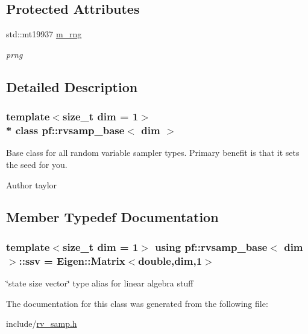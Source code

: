 \subsection*{Protected Attributes}
\begin{DoxyCompactItemize}
\item 
std\+::mt19937 \hyperlink{classpf_1_1rvsamp__base_ab24a599151b7ad0836ddee218b1941a1}{m\+\_\+rng}\hypertarget{classpf_1_1rvsamp__base_ab24a599151b7ad0836ddee218b1941a1}{}\label{classpf_1_1rvsamp__base_ab24a599151b7ad0836ddee218b1941a1}

\begin{DoxyCompactList}\small\item\em prng \end{DoxyCompactList}\end{DoxyCompactItemize}


\subsection{Detailed Description}
\subsubsection*{template$<$size\+\_\+t dim = 1$>$\\*
class pf\+::rvsamp\+\_\+base$<$ dim $>$}

Base class for all random variable sampler types. Primary benefit is that it sets the seed for you. 

\begin{DoxyAuthor}{Author}
taylor 
\end{DoxyAuthor}


\subsection{Member Typedef Documentation}
\subsubsection[{\texorpdfstring{ssv}{ssv}}]{\setlength{\rightskip}{0pt plus 5cm}template$<$size\+\_\+t dim = 1$>$ using {\bf pf\+::rvsamp\+\_\+base}$<$ dim $>$\+::{\bf ssv} =  Eigen\+::\+Matrix$<$double,dim,1$>$}\hypertarget{classpf_1_1rvsamp__base_a5d22b5297cc9ec74dfbc500b76e6747d}{}\label{classpf_1_1rvsamp__base_a5d22b5297cc9ec74dfbc500b76e6747d}
\char`\"{}state size vector\char`\"{} type alias for linear algebra stuff 

The documentation for this class was generated from the following file\+:\begin{DoxyCompactItemize}
\item 
include/\hyperlink{rv__samp_8h}{rv\+\_\+samp.\+h}\end{DoxyCompactItemize}
